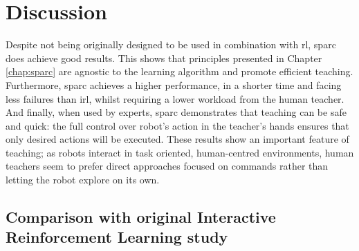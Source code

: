 \section{Discussion}
\label{sec:control_discussion}

Despite not being originally designed to be used in combination with \acrlong{rl}, \gls{sparc} does achieve good results. This shows that principles presented in Chapter \ref{chap:sparc} are agnostic to the learning algorithm and promote efficient teaching. Furthermore, \gls{sparc} achieves a higher performance, in a shorter time and facing less failures than \gls{irl}, whilst requiring a lower workload from the human teacher. And finally, when used by experts, \gls{sparc} demonstrates that teaching can be safe and quick: the full control over robot's action in the teacher's hands ensures that only desired actions will be executed. These results show an important feature of teaching; as robots interact in task oriented, human-centred environments, human teachers seem to prefer direct approaches focused on commands rather than letting the robot explore on its own.

\subsection{Comparison with original Interactive Reinforcement Learning study}

